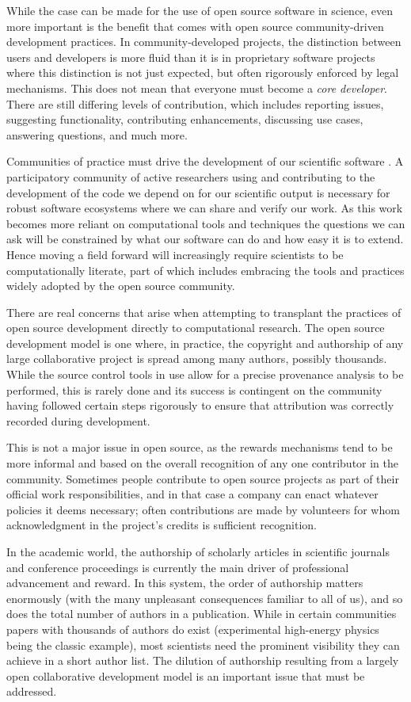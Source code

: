 \documentclass[ChapterTOCs,krantz2]{krantz} %
\begin{document}
While the case can be made for the use of open source software in science, even
more important is the benefit that comes with open source community-driven
development practices.  In community-developed projects, the distinction
between users and developers is more fluid than it is in proprietary software
projects where this distinction is not just expected, but often rigorously
enforced by legal mechanisms. This does not mean that everyone must become a
\emph{core developer}. There are still differing levels of contribution, which
includes reporting issues, suggesting functionality, contributing
enhancements, discussing use cases, answering questions, and much more.

Communities of practice must drive the development of our scientific software
\cite{turk2013scale}. A participatory community of active researchers using and
contributing to the development of the code we depend on for our scientific
output is necessary for robust software ecosystems where we can share and
verify our work. As this work becomes more reliant on computational tools and
techniques the questions we can ask will be constrained by what our software
can do and how easy it is to extend. Hence moving a field forward will
increasingly require scientists to be computationally literate, part of
which includes embracing the tools and practices widely adopted by the open
source community.

There are real concerns that arise when attempting to transplant the practices
of open source development directly to computational research. The open source
development model is one where, in practice, the copyright and authorship of
any large collaborative project is spread among many authors, possibly
thousands.  While the source control tools in use allow for a
precise provenance analysis to be performed, this is rarely done and
its success is contingent on the community having followed certain steps
rigorously to ensure that attribution was correctly recorded during
development.

This is not a major issue in open source, as the rewards mechanisms tend to be
more informal and based on the overall recognition of any one contributor in
the community. Sometimes people contribute to open source projects as part of
their official work responsibilities, and in that case a company can enact
whatever policies it deems necessary; often contributions are made by
volunteers for whom acknowledgment in the project's credits is sufficient
recognition.

In the academic world, the authorship of scholarly articles in scientific
journals and conference proceedings is currently the main driver of
professional advancement and reward. In this system, the order of authorship
matters enormously (with the many unpleasant consequences familiar to all of
us), and so does the total number of authors in a publication. While in certain
communities papers with thousands of authors do exist (experimental high-energy
physics being the classic example), most scientists need the prominent
visibility they can achieve in a short author list. The dilution of authorship
resulting from a largely open collaborative development model is an important
issue that must be addressed.
\end{document}
